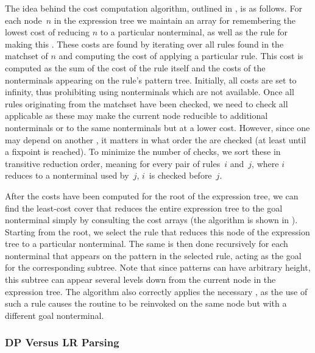 {The idea behind the cost computation algorithm, outlined in
, is as follows.
%
For each
\gls{node}~$n$ in the \gls{expression tree} we maintain an array for remembering
the lowest cost of reducing $n$ to a particular \gls{nonterminal}, as well as
the \gls{rule} for making this .
%
These costs are found
by iterating over all \glspl{rule} found in the \gls{matchset} of $n$ and
computing the cost of applying a particular \gls{rule}.
%
This cost is computed as
the sum of the cost of the \gls{rule} itself and the costs of the
\glspl{nonterminal} appearing on the rule's \gls{pattern tree}.
%
Initially, all
costs are set to infinity, thus prohibiting  using
\glspl{nonterminal} which are not available.
%
Once all \glspl{rule} originating
from the \gls{matchset} have been checked, we need to check all applicable
\tchainRules as these may make the current \gls{node} reducible to additional
\glspl{nonterminal} or to the same \glspl{nonterminal} but at a lower
cost.
%
However, since one \tchainRule may depend on another \tchainRule, it
matters in what order the \tchainRules are checked (at least until a fixpoint is
reached).
%
To minimize the number of checks, we sort these \tchainRules in
\gls{transitive reduction order}, meaning for every pair of \glspl{rule}~$i$
and~$j$, where $i$ reduces to a \gls{nonterminal} used by~$j$, $i$~is checked
before~$j$.

After the costs have been computed for the \gls{root} of the \gls{expression tree},
we can find the least-cost cover that reduces the entire \gls{expression tree} to
the goal \gls{nonterminal} simply by consulting the cost arrays (the algorithm
is shown in ).
%
Starting
from the \gls{root}, we select the \gls{rule} that reduces this \gls{node} of
the \gls{expression tree} to a particular \gls{nonterminal}.
%
The same is then done
recursively for each \gls{nonterminal} that appears on the pattern in the
selected \gls{rule}, acting as the goal for the corresponding
\gls{subtree}.
%
Note that since \glspl{pattern} can have arbitrary height, this
\gls{subtree} can appear several levels down from the current \gls{node} in the
\gls{expression tree}.
%
The algorithm also correctly applies the necessary
\tchainRules, as the use of such a \gls{rule} causes the routine to be
reinvoked on the same \gls{node} but with a different goal \gls{nonterminal}.


\subsubsection{DP Versus LR Parsing}

}
